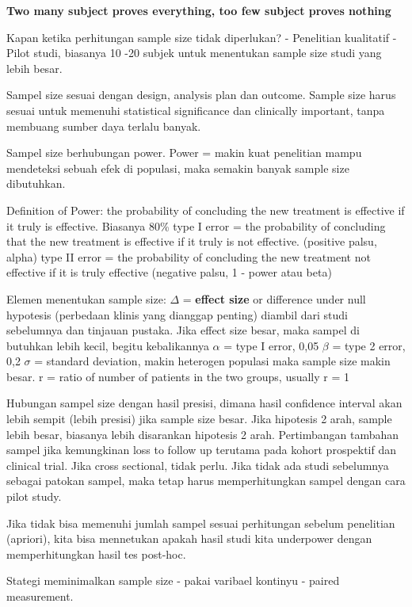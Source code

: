 \documentclass[
  letterpaper,
  DIV=11,
  numbers=noendperiod]{scrreprt}
\begin{document}
\textbf{Two many subject proves everything, too few subject proves
nothing}

Kapan ketika perhitungan sample size tidak diperlukan? - Penelitian
kualitatif - Pilot studi, biasanya 10 -20 subjek untuk menentukan sample
size studi yang lebih besar.

Sampel size sesuai dengan design, analysis plan dan outcome. Sample size
harus sesuai untuk memenuhi statistical significance dan clinically
important, tanpa membuang sumber daya terlalu banyak.

Sampel size berhubungan power. Power = makin kuat penelitian mampu
mendeteksi sebuah efek di populasi, maka semakin banyak sample size
dibutuhkan.

Definition of Power: the probability of concluding the new treatment is
effective if it truly is effective. Biasanya 80\% type I error = the
probability of concluding that the new treatment is effective if it
truly is not effective. (positive palsu, alpha) type II error = the
probability of concluding the new treatment not effective if it is truly
effective (negative palsu, 1 - power atau beta)

Elemen menentukan sample size: \(\Delta\) = \textbf{effect size} or
difference under null hypotesis (perbedaan klinis yang dianggap penting)
diambil dari studi sebelumnya dan tinjauan pustaka. Jika effect size
besar, maka sampel di butuhkan lebih kecil, begitu kebalikannya
\(\alpha\) = type I error, 0,05 \(\beta\) = type 2 error, 0,2 \(\sigma\)
= standard deviation, makin heterogen populasi maka sample size makin
besar. r = ratio of number of patients in the two groups, usually r = 1

Hubungan sampel size dengan hasil presisi, dimana hasil confidence
interval akan lebih sempit (lebih presisi) jika sample size besar. Jika
hipotesis 2 arah, sample lebih besar, biasanya lebih disarankan
hipotesis 2 arah. Pertimbangan tambahan sampel jika kemungkinan loss to
follow up terutama pada kohort prospektif dan clinical trial. Jika cross
sectional, tidak perlu. Jika tidak ada studi sebelumnya sebagai patokan
sampel, maka tetap harus memperhitungkan sampel dengan cara pilot study.

Jika tidak bisa memenuhi jumlah sampel sesuai perhitungan sebelum
penelitian (apriori), kita bisa mennetukan apakah hasil studi kita
underpower dengan memperhitungkan hasil tes post-hoc.

Stategi meminimalkan sample size - pakai varibael kontinyu - paired
measurement.
\end{document}
